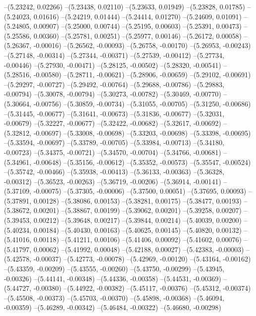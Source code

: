--(5.23242, 0.02266)
--(5.23438, 0.02110)
--(5.23633, 0.01949)
--(5.23828, 0.01785)
--(5.24023, 0.01616)
--(5.24219, 0.01444)
--(5.24414, 0.01270)
--(5.24609, 0.01091)
--(5.24805, 0.00907)
--(5.25000, 0.00744)
--(5.25195, 0.00603)
--(5.25391, 0.00473)
--(5.25586, 0.00360)
--(5.25781, 0.00251)
--(5.25977, 0.00146)
--(5.26172, 0.00058)
--(5.26367, -0.00016)
--(5.26562, -0.00093)
--(5.26758, -0.00170)
--(5.26953, -0.00243)
--(5.27148, -0.00314)
--(5.27344, -0.00371)
--(5.27539, -0.00412)
--(5.27734, -0.00446)
--(5.27930, -0.00471)
--(5.28125, -0.00502)
--(5.28320, -0.00541)
--(5.28516, -0.00580)
--(5.28711, -0.00621)
--(5.28906, -0.00659)
--(5.29102, -0.00691)
--(5.29297, -0.00727)
--(5.29492, -0.00764)
--(5.29688, -0.00786)
--(5.29883, -0.00794)
--(5.30078, -0.00794)
--(5.30273, -0.00782)
--(5.30469, -0.00770)
--(5.30664, -0.00756)
--(5.30859, -0.00734)
--(5.31055, -0.00705)
--(5.31250, -0.00686)
--(5.31445, -0.00677)
--(5.31641, -0.00673)
--(5.31836, -0.00677)
--(5.32031, -0.00679)
--(5.32227, -0.00677)
--(5.32422, -0.00682)
--(5.32617, -0.00692)
--(5.32812, -0.00697)
--(5.33008, -0.00698)
--(5.33203, -0.00698)
--(5.33398, -0.00695)
--(5.33594, -0.00697)
--(5.33789, -0.00705)
--(5.33984, -0.00713)
--(5.34180, -0.00723)
--(5.34375, -0.00721)
--(5.34570, -0.00704)
--(5.34766, -0.00681)
--(5.34961, -0.00648)
--(5.35156, -0.00612)
--(5.35352, -0.00573)
--(5.35547, -0.00524)
--(5.35742, -0.00466)
--(5.35938, -0.00413)
--(5.36133, -0.00363)
--(5.36328, -0.00312)
--(5.36523, -0.00263)
--(5.36719, -0.00206)
--(5.36914, -0.00141)
--(5.37109, -0.00075)
--(5.37305, -0.00006)
--(5.37500, 0.00051)
--(5.37695, 0.00093)
--(5.37891, 0.00128)
--(5.38086, 0.00153)
--(5.38281, 0.00175)
--(5.38477, 0.00193)
--(5.38672, 0.00201)
--(5.38867, 0.00199)
--(5.39062, 0.00201)
--(5.39258, 0.00207)
--(5.39453, 0.00212)
--(5.39648, 0.00217)
--(5.39844, 0.00214)
--(5.40039, 0.00200)
--(5.40234, 0.00184)
--(5.40430, 0.00163)
--(5.40625, 0.00145)
--(5.40820, 0.00132)
--(5.41016, 0.00118)
--(5.41211, 0.00106)
--(5.41406, 0.00092)
--(5.41602, 0.00076)
--(5.41797, 0.00062)
--(5.41992, 0.00048)
--(5.42188, 0.00027)
--(5.42383, -0.00003)
--(5.42578, -0.00037)
--(5.42773, -0.00078)
--(5.42969, -0.00120)
--(5.43164, -0.00162)
--(5.43359, -0.00209)
--(5.43555, -0.00260)
--(5.43750, -0.00299)
--(5.43945, -0.00326)
--(5.44141, -0.00348)
--(5.44336, -0.00358)
--(5.44531, -0.00369)
--(5.44727, -0.00380)
--(5.44922, -0.00382)
--(5.45117, -0.00376)
--(5.45312, -0.00374)
--(5.45508, -0.00373)
--(5.45703, -0.00370)
--(5.45898, -0.00368)
--(5.46094, -0.00359)
--(5.46289, -0.00342)
--(5.46484, -0.00322)
--(5.46680, -0.00298)
